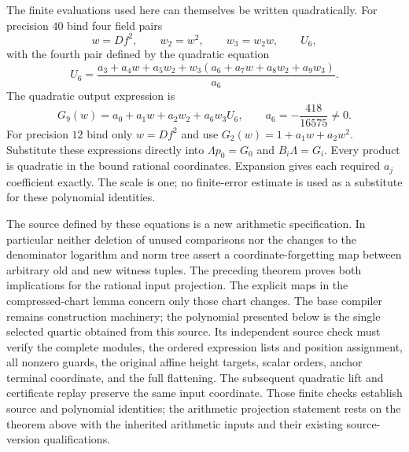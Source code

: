 The finite evaluations used here can themselves be written quadratically.
For precision $40$ bind four field pairs
\[
 w=Df^2,\qquad w_2=w^2,\qquad w_3=w_2w,\qquad U_6,
\]
with the fourth pair defined by the quadratic equation
\[
 U_6=\frac{a_3+a_4w+a_5w_2+
                  w_3(a_6+a_7w+a_8w_2+a_9w_3)}{a_6}.
\]
The quadratic output expression is
\[
 G_9(w)=a_0+a_1w+a_2w_2+a_6w_3U_6,
 \qquad a_6=-\frac{418}{16575}\ne0.
\]
For precision $12$ bind only $w=Df^2$ and use
$G_2(w)=1+a_1w+a_2w^2$. Substitute these expressions directly into
$\Lambda p_0=G_0$ and $B_i\Lambda=G_i$. Every product is quadratic in
the bound rational coordinates. Expansion gives each required $a_j$
coefficient exactly. The scale is one; no finite-error estimate is used
as a substitute for these polynomial identities.

The source defined by these equations is a new arithmetic specification.
In particular neither deletion of unused comparisons nor the changes to
the denominator logarithm and norm tree assert a coordinate-forgetting
map between arbitrary old and new witness tuples. The preceding theorem
proves both implications for the rational input projection. The explicit
maps in the compressed-chart lemma concern only those chart changes.
The base compiler remains construction machinery; the polynomial
presented below is the single selected quartic obtained from this source.
Its independent source check must verify the complete modules, the
ordered expression lists and position assignment, all nonzero guards,
the original affine height targets, scalar orders, anchor terminal
coordinate, and the full flattening. The subsequent quadratic lift and
certificate replay preserve the same input coordinate. Those finite
checks establish source and polynomial identities; the arithmetic
projection statement rests on the theorem above with the inherited
arithmetic inputs and their existing source-version qualifications.


